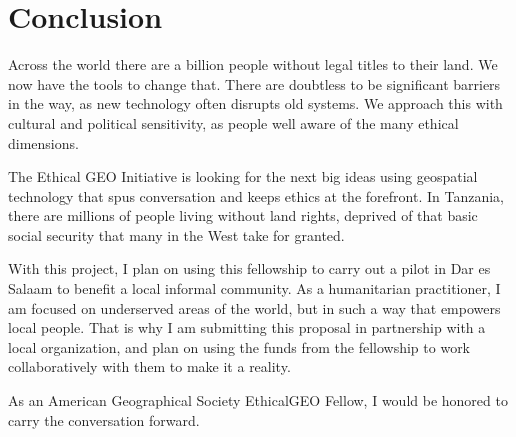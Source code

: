 \documentclass[a4paper,12pt,twoside]{article}
\begin{document}
\section{Conclusion}

Across the world there are a billion people without legal titles to their land. We now have the tools to change that. There are doubtless to be significant barriers in the way, as new technology often disrupts old systems. We approach this with cultural and political sensitivity, as people well aware of the many ethical dimensions. 
\bigskip

The Ethical GEO Initiative is looking for the next big ideas using geospatial technology that spus conversation and keeps ethics at the forefront. In Tanzania, there are millions of people living without land rights, deprived of that basic social security that many in the West take for granted. 
\bigskip

With this project, I plan on using this fellowship to carry out a pilot in Dar es Salaam to benefit a local informal community. As a humanitarian practitioner, I am focused on underserved areas of the world, but in such a way that empowers local people. That is why I am submitting this proposal in partnership with a local organization, and plan on using the funds from the fellowship to work collaboratively with them to make it a reality.
\bigskip

As an American Geographical Society EthicalGEO Fellow, I would be honored to carry the conversation forward. 
\end{document}
